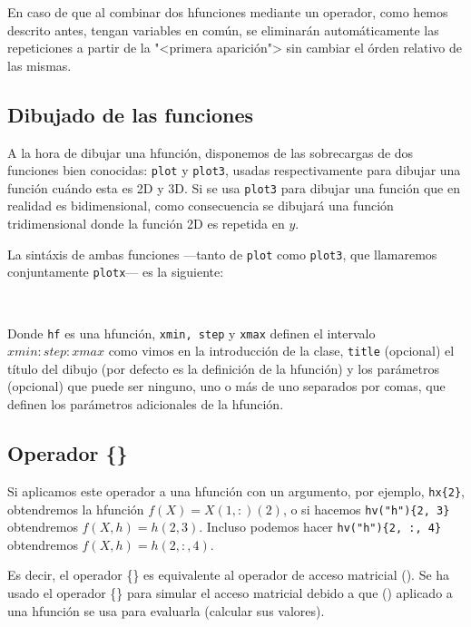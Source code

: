\documentclass{article}
\begin{document}
En caso de que al combinar dos hfunciones mediante un operador, como
hemos descrito antes, tengan variables en común, se eliminarán
automáticamente las repeticiones a partir de la "<primera
aparición"> sin cambiar el órden relativo de las mismas.

\subsection{Dibujado de las funciones}
\label{ssec:draw}
A la hora de dibujar una hfunción, disponemos de las sobrecargas de
dos funciones bien conocidas: \texttt{plot} y \texttt{plot3}, usadas
respectivamente para dibujar una función cuándo esta es 2D y 3D. Si se
usa \texttt{plot3} para dibujar una función que en realidad es
bidimensional, como consecuencia se dibujará una función
tridimensional donde la función 2D es repetida en $y$.

La sintáxis de ambas funciones ---tanto de \texttt{plot} como
\texttt{plot3}, que llamaremos conjuntamente \texttt{plotx}--- es la
siguiente:

\begin{center}
 \\
\end{center}

Donde \texttt{hf} es una hfunción, \texttt{xmin, step} y \texttt{xmax}
definen el intervalo $xmin:step:xmax$ como vimos en la introducción de
la clase, \texttt{title} (opcional) el título del dibujo (por defecto
es la definición de la hfunción) y los parámetros (opcional) que puede
ser ninguno, uno o más de uno separados por comas, que definen los
parámetros adicionales de la hfunción.

\subsection{Operador \{\}}
\label{ssec:ref}
Si aplicamos este operador a una hfunción con un argumento, por
ejemplo, \texttt{hx\{2\}}, obtendremos la hfunción $f(X) = X(1, :)(2)$,
o si hacemos \texttt{hv("h")\{2, 3\}} obtendremos $f(X, h) = h(2,
3)$. Incluso podemos hacer \texttt{hv("h")\{2, :, 4\}} obtendremos $f(X,
h) = h(2, :, 4)$.

Es decir, el operador \{\} es equivalente al operador de acceso
matricial (). Se ha usado el operador \{\} para simular el acceso
matricial debido a que () aplicado a una hfunción se usa para
evaluarla (calcular sus valores).
\end{document}
